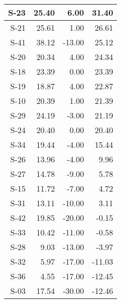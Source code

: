 \begin{tabular}{ | r | r | r | r | }
    \hline
                  S-23  &           25.40  &            6.00  &           31.40  \\
    \hline
                  S-21  &           25.61  &            1.00  &           26.61  \\
    \hline
                  S-41  &           38.12  &          -13.00  &           25.12  \\
    \hline
                  S-20  &           20.34  &            4.00  &           24.34  \\
    \hline
                  S-18  &           23.39  &            0.00  &           23.39  \\
    \hline
                  S-19  &           18.87  &            4.00  &           22.87  \\
    \hline
                  S-10  &           20.39  &            1.00  &           21.39  \\
    \hline
                  S-29  &           24.19  &           -3.00  &           21.19  \\
    \hline
                  S-24  &           20.40  &            0.00  &           20.40  \\
    \hline
                  S-34  &           19.44  &           -4.00  &           15.44  \\
    \hline
                  S-26  &           13.96  &           -4.00  &            9.96  \\
    \hline
                  S-27  &           14.78  &           -9.00  &            5.78  \\
    \hline
                  S-15  &           11.72  &           -7.00  &            4.72  \\
    \hline
                  S-31  &           13.11  &          -10.00  &            3.11  \\
    \hline
                  S-42  &           19.85  &          -20.00  &           -0.15  \\
    \hline
                  S-33  &           10.42  &          -11.00  &           -0.58  \\
    \hline
                  S-28  &            9.03  &          -13.00  &           -3.97  \\
    \hline
                  S-32  &            5.97  &          -17.00  &          -11.03  \\
    \hline
                  S-36  &            4.55  &          -17.00  &          -12.45  \\
    \hline
                  S-03  &           17.54  &          -30.00  &          -12.46  \\

\end{tabular}
